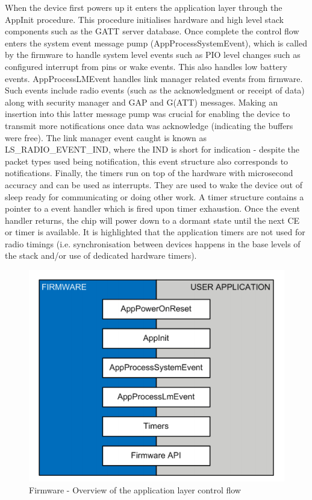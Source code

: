 \documentclass[]{article}
\begin{document}
When the device first powers up it enters the application layer through the AppInit procedure. This procedure initialises hardware and high level stack components such as the GATT server database. Once complete the control flow enters the system event message pump (AppProcessSystemEvent), which is called by the firmware to handle system level events such as PIO level changes such as configured interrupt from pins or wake events. This also handles low battery events. AppProcessLMEvent handles link manager related events from firmware. Such events include radio events (such as the acknowledgment or receipt of data) along with security manager and GAP and G(ATT) messages. Making an insertion into this latter message pump was crucial for enabling the device to transmit more notifications once data was acknowledge (indicating the buffers were free). The link manager event caught is known as LS\_RADIO\_EVENT\_IND, where the IND is short for indication - despite the packet types used being notification, this event structure also corresponds to notifications. Finally, the timers run on top of the hardware with microsecond accuracy and can be used as interrupts. They are used to wake the device out of sleep ready for communicating or doing other work. A timer structure contains a pointer to a event handler which is fired upon timer exhaustion. Once the event handler returns, the chip will power down to a dormant state until the next \ac{CE} or timer is available. It is highlighted that the application timers are not used for radio timings (i.e. synchronisation between devices happens in the base levels of the stack and/or use of dedicated hardware timers).


\begin{figure}[htb]
	\begin{center}
		\includegraphics{flow}
	\end{center}
	\caption{Firmware - Overview of the application layer control flow \cite{firmwaredev}}
	\label{fig:flow}
\end{figure}
\end{document}
